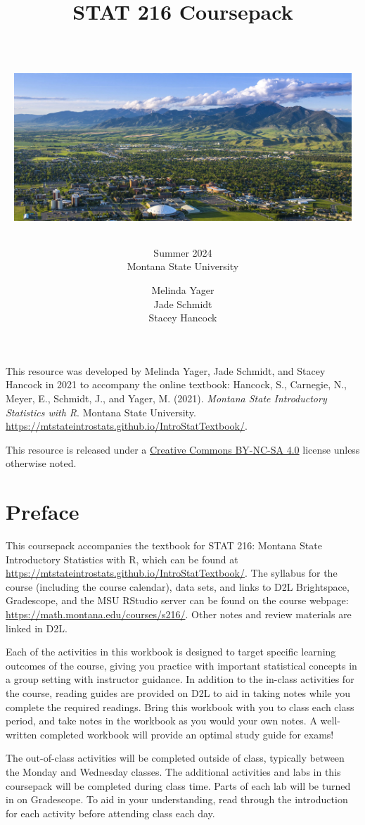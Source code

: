 \documentclass[
]{report}
\title{\textbf{STAT 216 Coursepack}\\
\strut \\
\includegraphics[width=5in,height=\textheight]{images/msu-campus.jpg}}
\subtitle{Summer 2024\\
Montana State University}
\author{Melinda Yager\\
Jade Schmidt\\
Stacey Hancock}
\date{}
\begin{document}
\maketitle

\newpage
\thispagestyle{empty}

This resource was developed by Melinda Yager, Jade Schmidt, and Stacey Hancock in 2021 to accompany the online textbook: Hancock, S., Carnegie, N., Meyer, E., Schmidt, J., and Yager, M. (2021). \emph{Montana State Introductory Statistics with R}. Montana State University. \url{https://mtstateintrostats.github.io/IntroStatTextbook/}.

This resource is released under a \href{https://creativecommons.org/licenses/by-nc-sa/4.0/}{Creative Commons BY-NC-SA 4.0} license unless otherwise noted.

\setcounter{tocdepth}{1}
\tableofcontents
\thispagestyle{empty}

\newpage
\setcounter{page}{1}

\hypertarget{preface}{%
\chapter*{Preface}\label{preface}}

This coursepack accompanies the textbook for STAT 216: Montana State Introductory Statistics with R, which can be found at \url{https://mtstateintrostats.github.io/IntroStatTextbook/}. The syllabus for the course (including the course calendar), data sets, and links to D2L Brightspace, Gradescope, and the MSU RStudio server can be found on the course webpage: \url{https://math.montana.edu/courses/s216/}.
Other notes and review materials are linked in D2L.

Each of the activities in this workbook is designed to target specific learning outcomes of the course, giving you practice with important statistical concepts in a group setting with instructor guidance. In addition to the in-class activities for the course, reading guides are provided on D2L to aid in taking notes while you complete the required readings. Bring this workbook with you to class each class period, and take notes in the workbook as you would your own notes. A well-written completed workbook will provide an optimal study guide for exams!

The out-of-class activities will be completed outside of class, typically between the Monday and Wednesday classes. The additional activities and labs in this coursepack will be completed during class time. Parts of each lab will be turned in on Gradescope. To aid in your understanding, read through the introduction for each activity before attending class each day.
\end{document}
